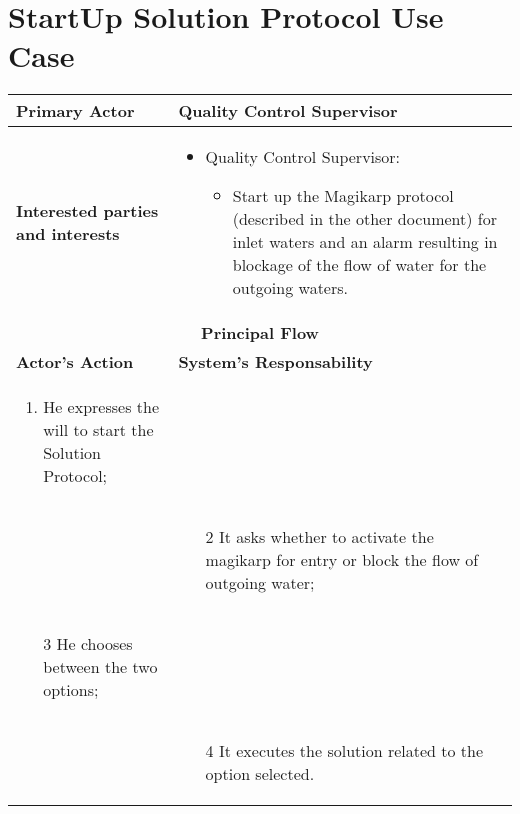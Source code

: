 \section{StartUp Solution Protocol Use Case}

\begin{longtable}{|p{7cm}|p{7cm}|}

\hline
\textbf{Primary Actor} & Quality Control Supervisor
\\


\hline
\textbf{Interested parties and interests} &
\begin{itemize}
\item Quality Control Supervisor:
	\begin{itemize}
 	\item Start up the Magikarp protocol (described in the other document) for inlet waters and an alarm resulting in blockage of the flow of water for the outgoing waters.
	\end{itemize}
\end{itemize}
\\


\hline
\multicolumn{2}{|c|}{\textbf{Principal Flow}} \\

\hline
\textbf{Actor's Action} & \textbf{System's Responsability}\\

\hline

\begin{enumerate}
\item He expresses the will to start the Solution Protocol;
\end{enumerate} &\\

& 
\begin{enumerate}
\item[2]It asks whether to activate the magikarp for entry or block the flow of outgoing water;
\end{enumerate}\\

\begin{enumerate}
\item[3]He chooses between the two options;			
\end{enumerate} &\\


& 
\begin{enumerate}
\item[4]It executes the solution related to the option selected.
\end{enumerate}\\

\hline
\end{longtable}

